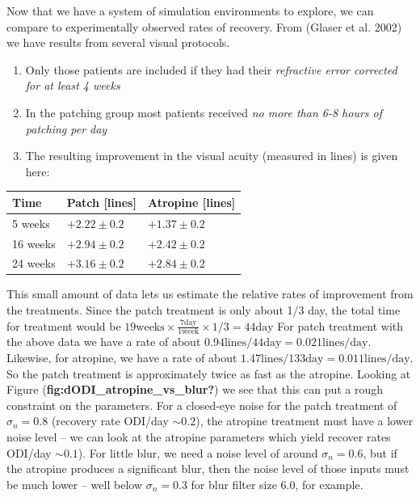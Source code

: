 \documentclass[
  letterpaper,
  DIV=11,
  numbers=noendperiod]{scrreprt}
\providecommand{\tightlist}{%
  \setlength{\itemsep}{0pt}\setlength{\parskip}{0pt}}\usepackage{longtable,booktabs,array}
\begin{document}
Now that we have a system of simulation environments to explore, we can
compare to experimentally observed rates of recovery. From (Glaser et
al. 2002) we have results from several visual protocols.

\begin{enumerate}
\def\labelenumi{\arabic{enumi}.}
\tightlist
\item
  Only those patients are included if they had their \emph{refractive
  error corrected for at least 4 weeks}
\item
  In the patching group most patients received \emph{no more than 6-8
  hours of patching per day}
\item
  The resulting improvement in the visual acuity (measured in lines) is
  given here:
\end{enumerate}

\begin{longtable}[]{@{}lll@{}}
\toprule()
Time & Patch {[}lines{]} & Atropine {[}lines{]} \\
\midrule()
\endhead
5 weeks & \(+2.22 \pm 0.2\) & \(+1.37 \pm 0.2\) \\
16 weeks & \(+2.94 \pm 0.2\) & \(+2.42 \pm 0.2\) \\
24 weeks & \(+3.16 \pm 0.2\) & \(+2.84 \pm 0.2\) \\
\bottomrule()
\end{longtable}

This small amount of data lets us estimate the relative rates of
improvement from the treatments. Since the patch treatment is only about
1/3 day, the total time for treatment would be
\(19 \text{weeks}\times \frac{7 \text{day}}{1 \text{week}}\times 1/3=44 \text{day}\)
For patch treatment with the above data we have a rate of about
\(0.94 \text{lines} / 44 \text{day}=0.021 \text{lines}/\text{day}\).
Likewise, for atropine, we have a rate of about
\(1.47\text{lines} / 133 \text{day}=0.011 \text{lines}/\text{day}\). So
the patch treatment is approximately twice as fast as the atropine.
Looking at Figure (\textbf{fig:dODI\_atropine\_vs\_blur?}) we see that
this can put a rough constraint on the parameters. For a closed-eye
noise for the patch treatment of \(\sigma_n=0.8\) (recovery rate ODI/day
\(\sim 0.2\)), the atropine treatment must have a lower noise level --
we can look at the atropine parameters which yield recover rates ODI/day
\(\sim 0.1\)). For little blur, we need a noise level of around
\(\sigma_n=0.6\), but if the atropine produces a significant blur, then
the noise level of those inputs must be much lower -- well below
\(\sigma_n=0.3\) for blur filter size 6.0, for example.
\end{document}
